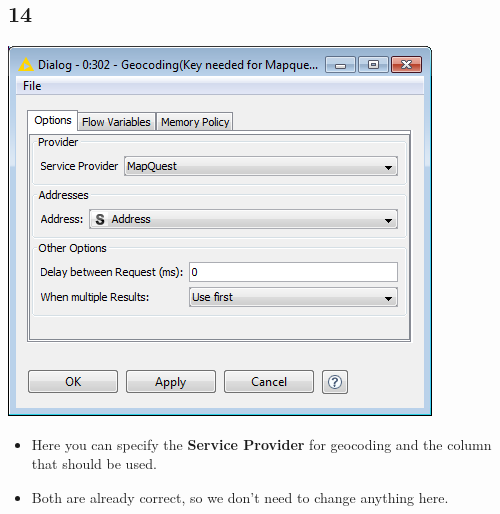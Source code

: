 \documentclass{beamer}
\begin{document}
\subsection{14}
\begin{frame}
	\begin{center}
  		\includegraphics[height=0.6\textheight]{14.png}
	\end{center}
	\begin{itemize}
		\item Here you can specify the \textbf{Service Provider} for geocoding and the column that should be used.
		\item Both are already correct, so we don't need to change anything here.
	\end{itemize}
\end{frame}
\end{document}
